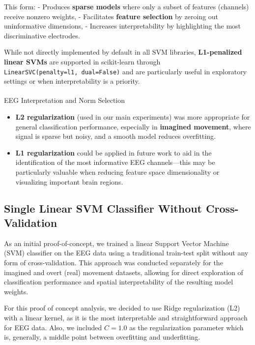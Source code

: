 \documentclass[
  letterpaper,
  DIV=11,
  numbers=noendperiod]{scrartcl}
\makeatletter
\let\oldparagraph\paragraph
\renewcommand{\paragraph}{
    \@ifstar
      \xxxParagraphStar
      \xxxParagraphNoStar
  }
\newcommand{\xxxParagraphStar}[1]{\oldparagraph*{#1}\mbox{}}
\newcommand{\xxxParagraphNoStar}[1]{\oldparagraph{#1}\mbox{}}
\providecommand{\tightlist}{%
  \setlength{\itemsep}{0pt}\setlength{\parskip}{0pt}}\usepackage{longtable,booktabs,array}
\makeatother
\begin{document}
This form: - Produces \textbf{sparse models} where only a subset of
features (channels) receive nonzero weights, - Facilitates
\textbf{feature selection} by zeroing out uninformative dimensions, -
Increases interpretability by highlighting the most discriminative
electrodes.

While not directly implemented by default in all SVM libraries,
\textbf{L1-penalized linear SVMs} are supported in scikit-learn through
\texttt{LinearSVC(penalty=\textquotesingle{}l1\textquotesingle{},\ dual=False)}
and are particularly useful in exploratory settings or when
interpretability is a priority.

\paragraph{EEG Interpretation and Norm
Selection}\label{eeg-interpretation-and-norm-selection}

\begin{itemize}
\tightlist
\item
  \textbf{L2 regularization} (used in our main experiments) was more
  appropriate for general classification performance, especially in
  \textbf{imagined movement}, where signal is sparse but noisy, and a
  smooth model reduces overfitting.
\item
  \textbf{L1 regularization} could be applied in future work to aid in
  the identification of the most informative EEG channels---this may be
  particularly valuable when reducing feature space dimensionality or
  visualizing important brain regions.
\end{itemize}

\subsection{Single Linear SVM Classifier Without
Cross-Validation}\label{single-linear-svm-classifier-without-cross-validation}

As an initial proof-of-concept, we trained a linear Support Vector
Machine (SVM) classifier on the EEG data using a traditional train-test
split without any form of cross-validation. This approach was conducted
separately for the imagined and overt (real) movement datasets, allowing
for direct exploration of classification performance and spatial
interpretability of the resulting model weights.

For this proof of concept analysis, we decided to use Ridge
regularization (L2) with a linear kernel, as it is the most
interpretable and straightforward approach for EEG data. Also, we
included \(C=1.0\) as the regularization parameter which is, generally,
a middle point between overfitting and underfitting.
\end{document}
